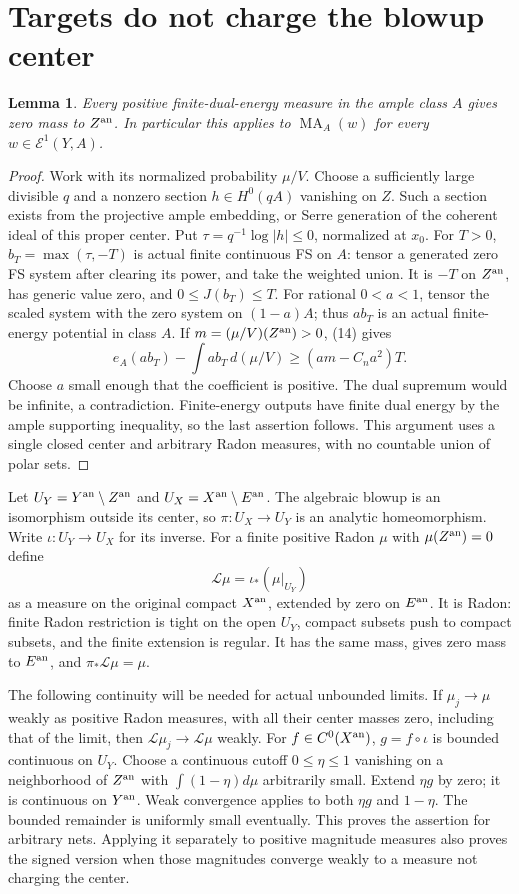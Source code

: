 \documentclass[11pt]{article}
\newcommand{\MA}{\operatorname{MA}}
\newtheorem{lemma}[theorem]{Lemma}
\begin{document}
\section{Targets do not charge the blowup center}
\begin{lemma}
Every positive finite-dual-energy measure in the ample class $A$
gives zero mass to $Z^{\rm an}$. In particular this applies to
$\MA_A(w)$ for every $w\in\mathcal E^1(Y,A)$.
\end{lemma}
\begin{proof}
Work with its normalized probability $\mu/V$. Choose a sufficiently
large divisible $q$ and a nonzero section $h\in H^0(qA)$ vanishing
on $Z$. Such a section exists from the projective ample embedding,
or Serre generation of the coherent ideal of this proper center.
Put $\tau=q^{-1}\log|h|\leq0$, normalized at $x_0$.
For $T>0$, $b_T=\max(\tau,-T)$ is actual finite continuous FS on
$A$: tensor a generated zero FS system after clearing its power,
and take the weighted union. It is $-T$ on $Z^{\rm an}$,
has generic value zero, and $0\leq J(b_T)\leq T$.
For rational $0<a<1$, tensor the scaled system with the zero system
on $(1-a)A$; thus $ab_T$ is an actual finite-energy potential in
class $A$. If $m=(\mu/V)(Z^{\rm an})>0$, (14) gives
\[
 e_A(ab_T)-\int ab_T\,d(\mu/V)
                \geq (am-C_na^2)T.
\]
Choose $a$ small enough that the coefficient is positive. The dual
supremum would be infinite, a contradiction. Finite-energy outputs
have finite dual energy by the ample supporting inequality, so the
last assertion follows. This argument uses a single closed center
and arbitrary Radon measures, with no countable union of polar sets.
\end{proof}

Let $U_Y=Y^{\rm an}\setminus Z^{\rm an}$ and
$U_X=X^{\rm an}\setminus E^{\rm an}$. The algebraic blowup is
an isomorphism outside its center, so $\pi:U_X\to U_Y$ is an
analytic homeomorphism. Write $\iota:U_Y\to U_X$ for its inverse.
For a finite positive Radon $\mu$ with $\mu(Z^{\rm an})=0$ define
\[
             \mathcal L\mu=\iota_*(\mu|_{U_Y})             \tag{15}
\]
as a measure on the original compact $X^{\rm an}$, extended by zero
on $E^{\rm an}$. It is Radon: finite Radon restriction is tight on
the open $U_Y$, compact subsets push to compact subsets, and the
finite extension is regular. It has the same mass, gives zero mass
to $E^{\rm an}$, and $\pi_*\mathcal L\mu=\mu$.

The following continuity will be needed for actual unbounded limits.
If $\mu_j\to\mu$ weakly as positive Radon measures, with all their
center masses zero, including that of the limit, then
$\mathcal L\mu_j\to\mathcal L\mu$ weakly. For
$f\in C^0(X^{\rm an})$, $g=f\circ\iota$ is bounded continuous
on $U_Y$. Choose a continuous cutoff $0\leq\eta\leq1$ vanishing
on a neighborhood of $Z^{\rm an}$ with $\int(1-\eta)d\mu$
arbitrarily small. Extend $\eta g$ by zero; it is continuous on
$Y^{\rm an}$. Weak convergence applies to both $\eta g$ and
$1-\eta$. The bounded remainder is uniformly small eventually.
This proves the assertion for arbitrary nets. Applying it separately
to positive magnitude measures also proves the signed version when
those magnitudes converge weakly to a measure not charging the center.
\end{document}
